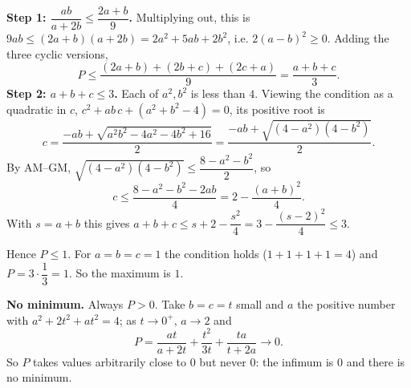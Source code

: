 \textbf{Step 1: $\dfrac{ab}{a+2b}\le\dfrac{2a+b}{9}$.} Multiplying out, this is $9ab\le(2a+b)(a+2b)=2a^2+5ab+2b^2$, i.e. $2(a-b)^2\ge0$. Adding the three cyclic versions,
\[
P\le\dfrac{(2a+b)+(2b+c)+(2c+a)}{9}=\dfrac{a+b+c}{3}.
\]
\textbf{Step 2: $a+b+c\le3$.} Each of $a^2,b^2$ is less than $4$. Viewing the condition as a quadratic in $c$, $c^2+ab\,c+(a^2+b^2-4)=0$, its positive root is
\[
c=\dfrac{-ab+\sqrt{a^2b^2-4a^2-4b^2+16}}{2}=\dfrac{-ab+\sqrt{(4-a^2)(4-b^2)}}{2}.
\]
By AM--GM, $\sqrt{(4-a^2)(4-b^2)}\le\dfrac{8-a^2-b^2}{2}$, so
\[
c\le\dfrac{8-a^2-b^2-2ab}{4}=2-\dfrac{(a+b)^2}{4}.
\]
With $s=a+b$ this gives $a+b+c\le s+2-\dfrac{s^2}{4}=3-\dfrac{(s-2)^2}{4}\le3$.

Hence $P\le1$. For $a=b=c=1$ the condition holds ($1+1+1+1=4$) and $P=3\cdot\dfrac{1}{3}=1$. So the maximum is $\boxed{1}$.

\textbf{No minimum.} Always $P>0$. Take $b=c=t$ small and $a$ the positive number with $a^2+2t^2+at^2=4$; as $t\to0^+$, $a\to2$ and
\[
P=\dfrac{at}{a+2t}+\dfrac{t^2}{3t}+\dfrac{ta}{t+2a}\to0 .
\]
So $P$ takes values arbitrarily close to $0$ but never $0$: the infimum is $0$ and there is no minimum.

